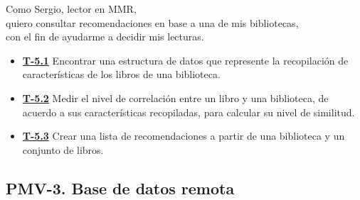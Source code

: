 \begin{itemize}
    Como Sergio, lector en MMR, \\
    quiero consultar recomendaciones en base a una de mis bibliotecas, \\
    con el fin de ayudarme a decidir mis lecturas.
    \begin{itemize}
        \item \href{https://github.com/Anglepi/My-Many-Reads/issues/66}{\textbf{T-5.1}} Encontrar una estructura de datos que represente la recopilación de características de los libros de una biblioteca.
        \item \href{https://github.com/Anglepi/My-Many-Reads/issues/67}{\textbf{T-5.2}} Medir el nivel de correlación entre un libro y una biblioteca, de acuerdo a sus características recopiladas, para calcular su nivel de similitud.
        \item \href{https://github.com/Anglepi/My-Many-Reads/issues/68}{\textbf{T-5.3}} Crear una lista de recomendaciones a partir de una biblioteca y un conjunto de libros.
    \end{itemize}
\end{itemize}

\subsection{PMV-3. Base de datos remota}
\label{pmv3}

